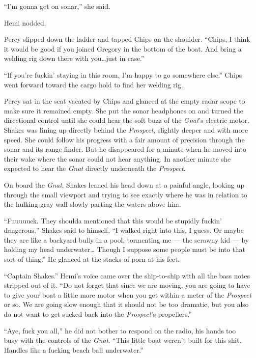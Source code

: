 \documentclass[
]{scrbook}
\begin{document}
``I'm gonna get on sonar,'' she said.

Hemi nodded.

Percy slipped down the ladder and tapped Chips on the shoulder. ``Chips,
I think it would be good if you joined Gregory in the bottom of the
boat. And bring a welding rig down there with you\ldots just in case.''

``If you're fuckin' staying in this room, I'm happy to go somewhere
else.'' Chips went forward toward the cargo hold to find her welding
rig.

Percy sat in the seat vacated by Chips and glanced at the empty radar
scope to make sure it remained empty. She put the sonar headphones on
and turned the directional control until she could hear the soft buzz of
the \emph{Gnat}'s electric motor. Shakes was lining up directly behind
the \emph{Prospect}, slightly deeper and with more speed. She could
follow his progress with a fair amount of precision through the sonar
and its range finder. But he disappeared for a minute when he moved into
their wake where the sonar could not hear anything. In another minute
she expected to hear the \emph{Gnat} directly underneath the
\emph{Prospect}.

\bigskip

On board the \emph{Gnat}, Shakes leaned his head down at a painful
angle, looking up through the small viewport and trying to see exactly
where he was in relation to the hulking gray wall slowly parting the
waters above him.

``Fuuuuuck. They shoulda mentioned that this would be stupidly fuckin'
dangerous,'' Shakes said to himself. ``I walked right into this, I
guess. Or maybe they are like a backyard bully in a pool, tormenting me
--- the scrawny kid --- by holding my head underwater\ldots{} Though I
suppose some people must be into that sort of thing.'' He glanced at the
stacks of porn at his feet.

``Captain Shakes.'' Hemi's voice came over the ship-to-ship with all the
bass notes stripped out of it. ``Do not forget that since we are moving,
you are going to have to give your boat a little more motor when you get
within a meter of the \emph{Prospect} or so. We are going slow enough
that it should not be too dramatic, but you also do not want to get
sucked back into the \emph{Prospect}'s propellers.''

``Aye, fuck you all,'' he did not bother to respond on the radio, his
hands too busy with the controls of the \emph{Gnat}. ``This little boat
weren't built for this shit. Handles like a fucking beach ball
underwater.''
\end{document}
